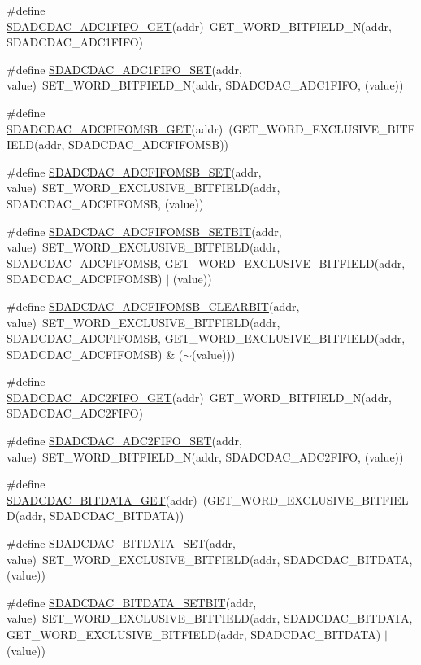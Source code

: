 \begin{DoxyCompactItemize}
\item 
\#define \hyperlink{a00568_a9f79763d73d0b7e49e875061c7494de6}{SDADCDAC\_\-ADC1FIFO\_\-GET}(addr)~GET\_\-WORD\_\-BITFIELD\_\-N(addr, SDADCDAC\_\-ADC1FIFO)
\item 
\#define \hyperlink{a00568_aaeb37c428959fe4a4d8a9f2a64d3df6a}{SDADCDAC\_\-ADC1FIFO\_\-SET}(addr, value)~SET\_\-WORD\_\-BITFIELD\_\-N(addr, SDADCDAC\_\-ADC1FIFO, (value))
\item 
\#define \hyperlink{a00568_a7cec46403bef10744a1e385fe597a08b}{SDADCDAC\_\-ADCFIFOMSB\_\-GET}(addr)~(GET\_\-WORD\_\-EXCLUSIVE\_\-BITFIELD(addr, SDADCDAC\_\-ADCFIFOMSB))
\item 
\#define \hyperlink{a00568_acd2bbd6422ee3af73d3e58eecabffd3b}{SDADCDAC\_\-ADCFIFOMSB\_\-SET}(addr, value)~SET\_\-WORD\_\-EXCLUSIVE\_\-BITFIELD(addr, SDADCDAC\_\-ADCFIFOMSB, (value))
\item 
\#define \hyperlink{a00568_a8278796ab260203186646928b4b17fe7}{SDADCDAC\_\-ADCFIFOMSB\_\-SETBIT}(addr, value)~SET\_\-WORD\_\-EXCLUSIVE\_\-BITFIELD(addr, SDADCDAC\_\-ADCFIFOMSB, GET\_\-WORD\_\-EXCLUSIVE\_\-BITFIELD(addr, SDADCDAC\_\-ADCFIFOMSB) $|$ (value))
\item 
\#define \hyperlink{a00568_aa1e95a23758bf5ad192f9acc4ab55f92}{SDADCDAC\_\-ADCFIFOMSB\_\-CLEARBIT}(addr, value)~SET\_\-WORD\_\-EXCLUSIVE\_\-BITFIELD(addr, SDADCDAC\_\-ADCFIFOMSB, GET\_\-WORD\_\-EXCLUSIVE\_\-BITFIELD(addr, SDADCDAC\_\-ADCFIFOMSB) \& ($\sim$(value)))
\item 
\#define \hyperlink{a00568_ad77dfc7a2b1d43261072ecb13420ab27}{SDADCDAC\_\-ADC2FIFO\_\-GET}(addr)~GET\_\-WORD\_\-BITFIELD\_\-N(addr, SDADCDAC\_\-ADC2FIFO)
\item 
\#define \hyperlink{a00568_ad646937d26f29811548ec3afd7b238d2}{SDADCDAC\_\-ADC2FIFO\_\-SET}(addr, value)~SET\_\-WORD\_\-BITFIELD\_\-N(addr, SDADCDAC\_\-ADC2FIFO, (value))
\item 
\#define \hyperlink{a00568_a775807582635c7911cabb644ff2bb849}{SDADCDAC\_\-BITDATA\_\-GET}(addr)~(GET\_\-WORD\_\-EXCLUSIVE\_\-BITFIELD(addr, SDADCDAC\_\-BITDATA))
\item 
\#define \hyperlink{a00568_a30743776be4b6b803eccea16d5a88b6f}{SDADCDAC\_\-BITDATA\_\-SET}(addr, value)~SET\_\-WORD\_\-EXCLUSIVE\_\-BITFIELD(addr, SDADCDAC\_\-BITDATA, (value))
\item 
\#define \hyperlink{a00568_a3c3d96c1427cd9de5c0e97bd47336398}{SDADCDAC\_\-BITDATA\_\-SETBIT}(addr, value)~SET\_\-WORD\_\-EXCLUSIVE\_\-BITFIELD(addr, SDADCDAC\_\-BITDATA, GET\_\-WORD\_\-EXCLUSIVE\_\-BITFIELD(addr, SDADCDAC\_\-BITDATA) $|$ (value))

\end{DoxyCompactItemize}
